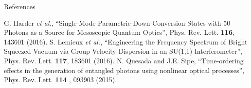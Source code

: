 \documentclass[final]{beamer} %
\newcommand{\ea}{\emph{et al.}}
\begin{document}
\begin{frame}[t]
\begin{columns}[t]
\begin{column}{0.30\paperwidth}
\begin{alertblock}{References}
\begin{thebibliography}{99}
 G. Harder \ea, ``Single-Mode Parametric-Down-Conversion States with 50 Photons as a Source for Mesoscopic Quantum Optics'', Phys. Rev. Lett. {\bf 116}, 143601 (2016).
 S. Lemieux \ea, ``Engineering the Frequency Spectrum of Bright Squeezed Vacuum via Group Velocity Dispersion in an SU(1,1) Interferometer'', Phys. Rev. Lett. {\bf 117}, 183601 (2016).
 N. Quesada and J.E. Sipe, ``Time-ordering effects in the generation of entangled photons using nonlinear optical processes'', Phys. Rev. Lett. {\bf 114} , 093903 (2015).
\end{thebibliography}
\end{alertblock}

  \end{column}
 \end{columns}
\end{frame}
\end{document}
